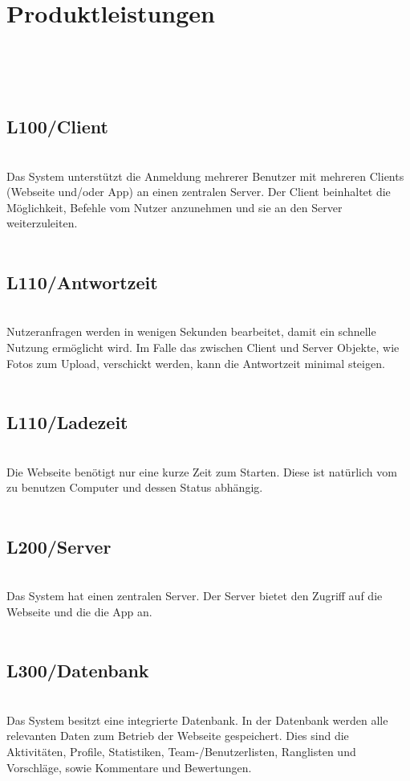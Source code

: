 ﻿\section{Produktleistungen}\\
\\
\\
\subsection{L100/Client} \\
Das System unterstützt die Anmeldung mehrerer Benutzer mit mehreren Clients (Webseite und/oder App) an einen zentralen Server. Der Client beinhaltet die Möglichkeit, Befehle vom Nutzer anzunehmen und sie an den Server weiterzuleiten. \\
\\
\subsection{L110/Antwortzeit} \\
Nutzeranfragen werden in wenigen Sekunden bearbeitet, damit ein schnelle Nutzung ermöglicht wird. Im Falle das zwischen Client und Server Objekte, wie Fotos zum Upload, verschickt werden, kann die Antwortzeit minimal steigen. \\
\\
\subsection{L110/Ladezeit} \\
Die Webseite benötigt nur eine kurze Zeit zum Starten. Diese ist natürlich vom zu benutzen Computer und dessen Status abhängig. \\
\\
\subsection{L200/Server} \\
Das System hat einen zentralen Server. Der Server bietet den Zugriff auf die Webseite und die die App an. \\
\\
\subsection{L300/Datenbank} \\
Das System besitzt eine integrierte Datenbank. In der Datenbank werden alle relevanten Daten zum Betrieb der Webseite gespeichert. Dies sind die Aktivitäten, Profile, Statistiken, Team-/Benutzerlisten, Ranglisten und Vorschläge, sowie Kommentare und Bewertungen.\\
\\
